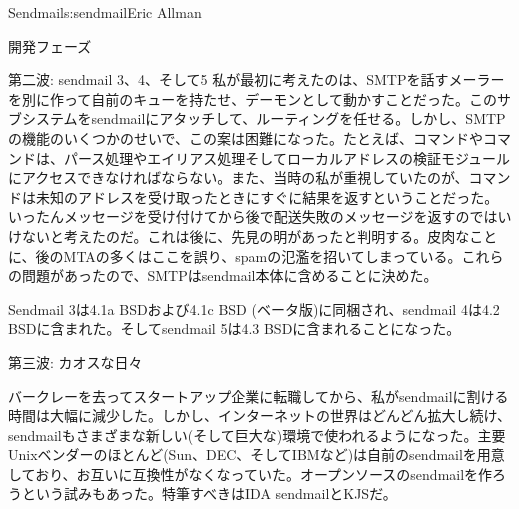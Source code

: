 \begin{aosachapter}{Sendmail}{s:sendmail}{Eric Allman}
\begin{aosasect1}{開発フェーズ}
\begin{aosasect2}{第二波: sendmail 3、4、そして5}
私が最初に考えたのは、SMTPを話すメーラーを別に作って自前のキューを持たせ、デーモンとして動かすことだった。このサブシステムをsendmailにアタッチして、ルーティングを任せる。しかし、SMTPの機能のいくつかのせいで、この案は困難になった。たとえば、コマンドやコマンドは、パース処理やエイリアス処理そしてローカルアドレスの検証モジュールにアクセスできなければならない。また、当時の私が重視していたのが、コマンドは未知のアドレスを受け取ったときにすぐに結果を返すということだった。いったんメッセージを受け付けてから後で配送失敗のメッセージを返すのではいけないと考えたのだ。これは後に、先見の明があったと判明する。皮肉なことに、後のMTAの多くはここを誤り、spamの氾濫を招いてしまっている。これらの問題があったので、SMTPはsendmail本体に含めることに決めた。

Sendmail 3は4.1a BSDおよび4.1c BSD (ベータ版)に同梱され、sendmail 4は4.2 BSDに含まれた。そしてsendmail 5は4.3 BSDに含まれることになった。

\end{aosasect2}

\begin{aosasect2}{第三波: カオスな日々}

バークレーを去ってスタートアップ企業に転職してから、私がsendmailに割ける時間は大幅に減少した。しかし、インターネットの世界はどんどん拡大し続け、sendmailもさまざまな新しい(そして巨大な)環境で使われるようになった。主要Unixベンダーのほとんど(Sun、DEC、そしてIBMなど)は自前のsendmailを用意しており、お互いに互換性がなくなっていた。オープンソースのsendmailを作ろうという試みもあった。特筆すべきはIDA sendmailとKJSだ。


\end{aosasect2}
\end{aosasect1}
\end{aosachapter}
